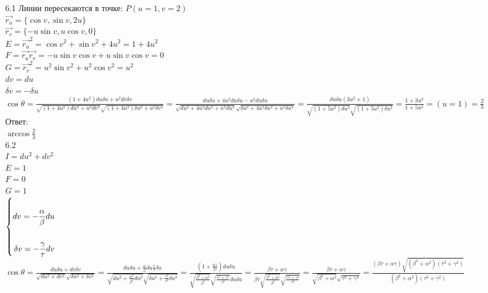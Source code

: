 \documentclass[a4paper, 12pt]{article}
\begin{document}
6.1
Линии пересекаются в точке: $P({u}=1,{v}=2)$ \\
$\vec{r_{u}}=\{\cos{v},\sin{v},2{u}\}$ \\
$\vec{r_{v}}=\{-{u}\sin{v},{u}\cos{v},0\}$ \\
$E=\vec{r_{u}}^2=\cos{v}^2+\sin{v}^2+4{u}^2=1+4{u}^2$ \\
$F=\vec{r_{u}}\vec{r_{v}}=-{u}\sin{v}\cos{v}+{u}\sin{v}\cos{v}=0$ \\
$G=\vec{r_{v}}^2={u}^2\sin{v}^2+{u}^2\cos{v}^2={u}^2$ \\
$d{v}=d{u}$ \\
$\delta{v}=-\delta{u}$ \\
$\cos{\theta}=\frac{(1+4{u}^2)d{u}\delta{u}+{u}^2d{v}\delta{v}}{\sqrt{(1+4{u}^2)d{u}^2+{u}^2d{v}^2}\sqrt{(1+4{u}^2)\delta{u}^2+{u}^2\delta{v}^2}}=\frac{d{u}\delta{u}+4{u}^2d{u}\delta{u}-{u}^2d{u}\delta{u}}{\sqrt{d{u}^2+4{u}^2d{u}^2+{u}^2d{u}^2}\sqrt{\delta{u}^2+4{u}^2\delta{u}^2+{u}^2\delta{u}^2}}=\frac{d{u}\delta{u}(3{u}^2+1)}{\sqrt{(1+5{u}^2)d{u}^2}\sqrt{(1+5{u}^2)\delta{u}^2}}=\frac{1+3u^2}{1+5{u}^2}=({u=1})=\frac{2}{3}$ \\
Ответ: \\
$\arccos{\frac{2}{3}}$ \\
6.2 \\
$I=d{u}^2+d{v}^2$ \\
$E=1$ \\
$F=0$ \\
$G=1$ \\
$\left\{ \\
\begin{aligned} \\
d{v}=-\frac{\alpha}{\beta}d{u}\\ \\
\delta{v}=-\frac{\gamma}{\tau}d{v} \\
\end{aligned} \\
\right.$ \\
$\cos{\theta}=\frac{d{u}\delta{u}+d{v}\delta{v}}{\sqrt{d{u}^2+d{v}^2}\sqrt{\delta{u}^2+\delta{v}^2}}=\frac{d{u}\delta{u}+\frac{\alpha}{\beta}d{u}\frac{\gamma}{\tau}\delta{u}}{\sqrt{d{u}^2+\frac{\alpha^2}{\beta^2}d{u}^2}\sqrt{\delta{u}^2+\frac{\gamma^2}{\tau^2}\delta{u}^2}}=\frac{(1+\frac{\alpha\gamma}{\beta\tau})d{u}\delta{u}}{\sqrt{\frac{\beta^2+\alpha^2}{\beta^2}}\sqrt{\frac{\tau^2+\gamma^2}{\tau^2}}d{u}\delta{u}}=\frac{\beta\tau+\alpha\gamma}{\beta\tau\sqrt{\frac{\beta^2+\alpha^2}{\beta^2}}\sqrt{\frac{\tau^2+\gamma^2}{\tau^2}}}=\frac{\beta\tau+\alpha\gamma}{\sqrt{\beta^2+\alpha^2}\sqrt{\tau^2+\gamma^2}}=\frac{(\beta\tau+\alpha\gamma)\sqrt{(\beta^2+\alpha^2)(\tau^2+\gamma^2)}}{(\beta^2+\alpha^2)(\tau^2+\gamma^2)}$ \\
\end{document}
